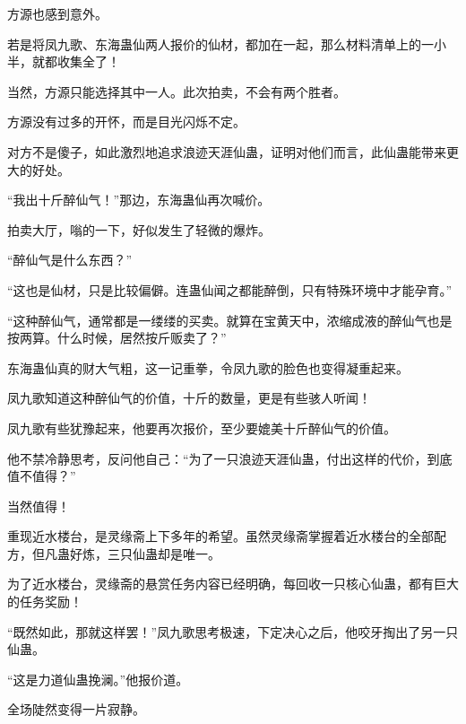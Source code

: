 \begin{this_body}
方源也感到意外。

若是将凤九歌、东海蛊仙两人报价的仙材，都加在一起，那么材料清单上的一小半，就都收集全了！

当然，方源只能选择其中一人。此次拍卖，不会有两个胜者。

方源没有过多的开怀，而是目光闪烁不定。

对方不是傻子，如此激烈地追求浪迹天涯仙蛊，证明对他们而言，此仙蛊能带来更大的好处。

“我出十斤醉仙气！”那边，东海蛊仙再次喊价。

拍卖大厅，嗡的一下，好似发生了轻微的爆炸。

“醉仙气是什么东西？”

“这也是仙材，只是比较偏僻。连蛊仙闻之都能醉倒，只有特殊环境中才能孕育。”

“这种醉仙气，通常都是一缕缕的买卖。就算在宝黄天中，浓缩成液的醉仙气也是按两算。什么时候，居然按斤贩卖了？”

东海蛊仙真的财大气粗，这一记重拳，令凤九歌的脸色也变得凝重起来。

凤九歌知道这种醉仙气的价值，十斤的数量，更是有些骇人听闻！

凤九歌有些犹豫起来，他要再次报价，至少要媲美十斤醉仙气的价值。

他不禁冷静思考，反问他自己：“为了一只浪迹天涯仙蛊，付出这样的代价，到底值不值得？”

当然值得！

重现近水楼台，是灵缘斋上下多年的希望。虽然灵缘斋掌握着近水楼台的全部配方，但凡蛊好炼，三只仙蛊却是唯一。

为了近水楼台，灵缘斋的悬赏任务内容已经明确，每回收一只核心仙蛊，都有巨大的任务奖励！

“既然如此，那就这样罢！”凤九歌思考极速，下定决心之后，他咬牙掏出了另一只仙蛊。

“这是力道仙蛊挽澜。”他报价道。

全场陡然变得一片寂静。

\end{this_body}

